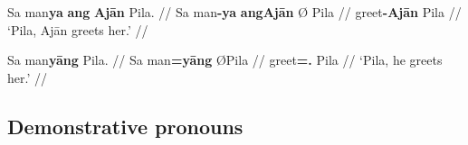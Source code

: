 \pex
\a\begingl
	\gla Sa man\textbf{ya} \textbf{ang} \textbf{Ajān} {} Pila. //
	\glb Sa man\textbf{-ya} \textbf{ang} \textbf{​Ajān} Ø ​Pila //
	\glc \PatT{} greet\textbf{-\TsgM{}} \textbf{\Aarg{}} \textbf{​Ajān} 
		\Top{} ​Pila //
	\glft `Pila, Ajān greets her.' //
\endgl

\a\begingl
	\gla Sa man\textbf{yāng} {} Pila. //
	\glb Sa man\textbf{=yāng} Ø ​Pila //
	\glc \PatT{} greet\textbf{=\TsgM{}.\Aarg{}} \Top{} ​Pila //
	\glft `Pila, he greets her.' //
\endgl
\xe


% 
% 
% 

\subsection{Demonstrative pronouns}

